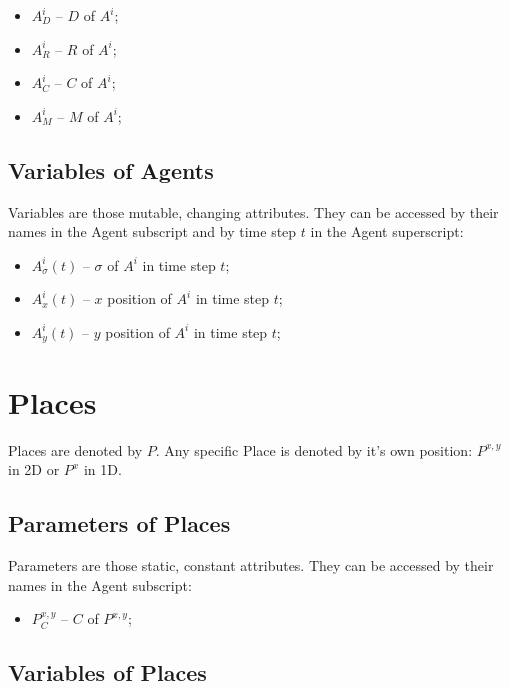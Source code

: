 \documentclass{article}
\begin{document}
\begin{itemize}
    \item $A^{i}_{D}$ -- $D$ of $A^{i}$;
    \item $A^{i}_{R}$ -- $R$ of $A^{i}$;
    \item $A^{i}_{C}$ -- $C$ of $A^{i}$;
    \item $A^{i}_{M}$ -- $M$ of $A^{i}$;
\end{itemize}

\subsection{Variables of Agents}

\par Variables are those mutable, changing attributes. They can be accessed by their names in the Agent subscript and by time step $t$ in the Agent superscript: 

\begin{itemize}
    \item $A^{i}_{\sigma}(t)$ -- $\sigma$ of $A^{i}$ in time step $t$;
    \item $A^{i}_{x}(t)$ -- $x$ position of $A^{i}$ in time step $t$;
    \item $A^{i}_{y}(t)$ -- $y$ position  of $A^{i}$ in time step $t$;
\end{itemize}


\section{Places}

\par Places are denoted by $P$. Any specific Place is denoted by it's own position: $P^{x,y}$ in 2D or $P^{x}$ in 1D.

\subsection{Parameters of Places}

\par Parameters are those static, constant attributes. They can be accessed by their names in the Agent subscript:

\begin{itemize}
    \item $P^{x,y}_{C}$ -- $C$ of $P^{x,y}$;
\end{itemize}

\subsection{Variables of Places}
\end{document}
